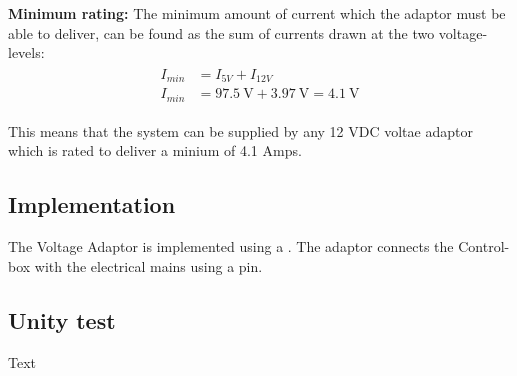 \textbf{Minimum rating:} The minimum amount of current which the adaptor must be able to deliver, can be found as the sum of currents drawn at the two voltage-levels:
\begin{align}
	\begin{split}
		I_{min} &= I_{5V} + I_{12V}\\
		I_{min} &= \SI{97.5}{\volt} + \SI{3.97}{\volt} = \SI{4.1}{\volt}
	\end{split}
\end{align}

This means that the system can be supplied by any 12 VDC voltae adaptor which is rated to deliver a minium of 4.1 Amps.

\subsection{Implementation}
The Voltage Adaptor is implemented using a . The adaptor connects the Control-box with the electrical mains using a  pin.

\subsection{Unity test}
Text